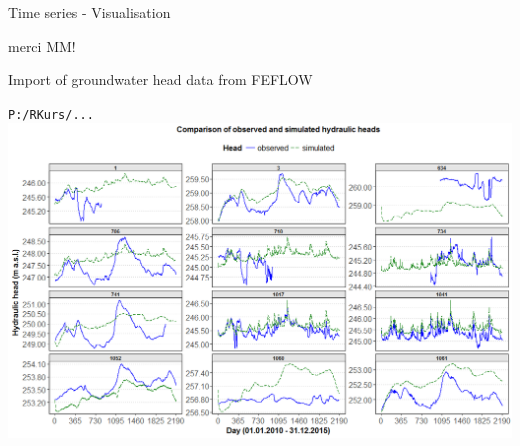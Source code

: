 \documentclass[8pt,ignorenonframetext,]{beamer}
\begin{document}
\begin{frame}[fragile]{Time series - Visualisation}

merci MM!

Import of groundwater head data from FEFLOW

\texttt{P:/RKurs/...}
\includegraphics{imgPres/time_series_head_analysis01.png}

\end{frame}
\end{document}
